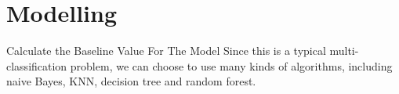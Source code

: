 \documentclass[
 size=14pt,
 paper=smartboard,  %
 mode=present, 		%
 display=slides, 	%
 style=tuliplab,  	%
 pauseslide,
 fleqn,leqno]{powerdot}
\begin{document}






\section{Modelling}


\begin{slide}{Calculate the Baseline Value For The Model}
  Since this is a typical multi-classification problem, we 
  can choose to use many kinds of algorithms, including naive
   Bayes, KNN, decision tree and random forest.
\end{slide}




\end{document}
